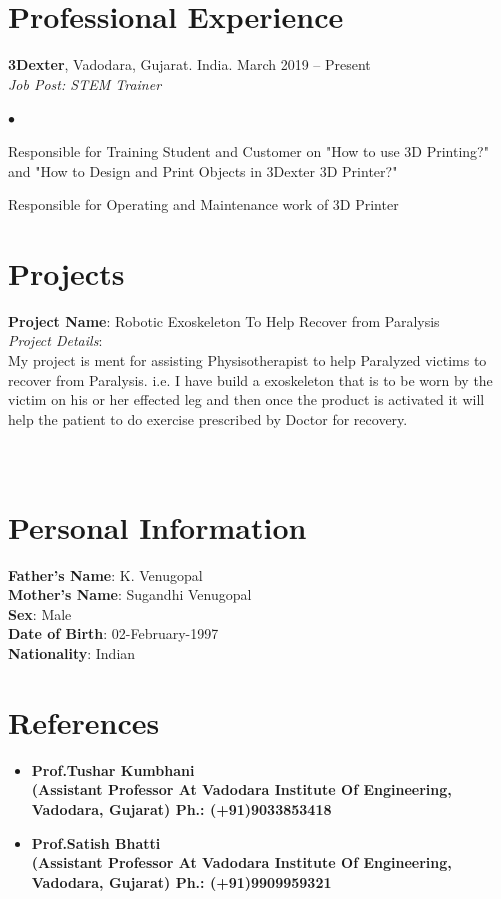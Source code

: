 \documentclass[margin,line]{res}
\newenvironment{list2}{
  \begin{list}{$\bullet$}{%
      \setlength{\itemsep}{0in}
      \setlength{\parsep}{0in} \setlength{\parskip}{0in}
      \setlength{\topsep}{0in} \setlength{\partopsep}{0in}
      \setlength{\leftmargin}{0.2in}}}{\end{list}}
\begin{document}
\begin{resume}
\section{\sc Professional Experience}
{\bf 3Dexter}, Vadodara, Gujarat. India. \hfill{March 2019 -- Present}\\
{\em Job Post: STEM Trainer}
\begin{list2} %
\item Responsible for Training Student and Customer on "How to use 3D Printing?" and "How to Design and Print Objects in 3Dexter 3D Printer?"  \\
\item Responsible for Operating and Maintenance work of 3D Printer\\
\end{list2}
\section{\sc Projects}
{\bf Project Name}: Robotic Exoskeleton To Help Recover from Paralysis\\
{\em Project Details}:\\
My project is ment for assisting Physisotherapist to help Paralyzed victims to recover from Paralysis. i.e. I have build a exoskeleton that is to be worn by the victim on his or her effected leg and then once the product is activated it will help the patient to do exercise prescribed by Doctor for recovery.
\\
\\
\\
\section{\sc Personal Information}
{\bf Father’s Name}: K. Venugopal\\
{\bf Mother’s Name}: Sugandhi Venugopal\\
{\bf Sex}: Male\\
{\bf Date of Birth}: 02-February-1997\\
{\bf Nationality}: Indian\\
\section{\sc References }
\begin{itemize}
\item{\bf Prof.Tushar Kumbhani \\
 (Assistant Professor At Vadodara Institute Of Engineering, Vadodara, Gujarat)
 \hfill Ph.: (+91)9033853418}\\
\item{\bf Prof.Satish Bhatti\\
 (Assistant Professor At Vadodara Institute Of Engineering, Vadodara, Gujarat)
 \hfill Ph.: (+91)9909959321}\\
\end{itemize}
\vspace{5in}



\end{resume}
\end{document}
